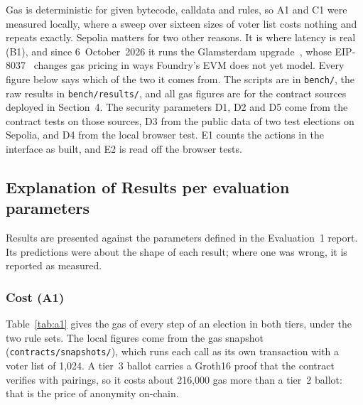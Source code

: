 Gas is deterministic for given bytecode, calldata and rules, so A1 and C1 were
measured locally, where a sweep over sixteen sizes of voter list costs nothing
and repeats exactly. Sepolia matters for two other reasons. It is where latency is
real (B1), and since 6~October~2026 it runs the Glamsterdam
upgrade~\cite{glamsterdam}, whose EIP-8037~\cite{eip8037} changes gas pricing in
ways Foundry's EVM does not yet model. Every figure below says which of the two
it comes from. The scripts are in \texttt{bench/}, the raw results in
\texttt{bench/results/}, and all gas figures are for the contract sources
deployed in Section~4. The security parameters D1, D2 and D5 come from the
contract tests on those sources, D3 from the public data of two test elections
on Sepolia, and D4 from the local browser test. E1 counts the actions in the
interface as built, and E2 is read off the browser tests.

\subsection{Explanation of Results per evaluation parameters}

Results are presented against the parameters defined in the Evaluation~1
report. Its predictions were about the shape of each result; where one was
wrong, it is reported as measured.

\subsubsection{Cost (A1)}

Table~\ref{tab:a1} gives the gas of every step of an election in both tiers,
under the two rule sets. The local figures come from the gas snapshot
(\texttt{contracts/snapshots/}), which runs each call as its own transaction
with a voter list of 1,024. A tier~3 ballot carries a Groth16 proof that the
contract verifies with pairings, so it costs about 216,000 gas more than a
tier~2 ballot: that is the price of anonymity on-chain.

